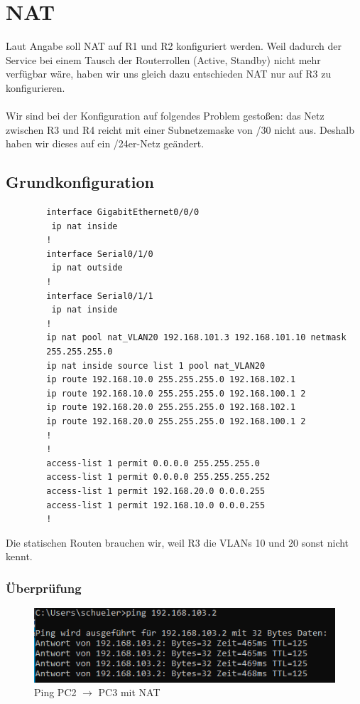 \documentclass[a4paper, ngerman]{article}
\begin{document}
\section{NAT}
Laut Angabe soll NAT auf R1 und R2 konfiguriert werden. Weil dadurch der Service bei einem Tausch der Routerrollen (Active, Standby)
nicht mehr verfügbar wäre, haben wir uns gleich dazu entschieden NAT nur auf R3 zu konfigurieren. \\ \\
Wir sind bei der Konfiguration auf folgendes Problem gestoßen: das Netz zwischen R3 und R4 reicht mit einer Subnetzemaske
von /30 nicht aus. Deshalb haben wir dieses auf ein /24er-Netz geändert.

\subsection{Grundkonfiguration}
\begin{framed}
    \begin{verbatim}
        interface GigabitEthernet0/0/0
         ip nat inside
        !
        interface Serial0/1/0
         ip nat outside
        !
        interface Serial0/1/1
         ip nat inside
        !
        ip nat pool nat_VLAN20 192.168.101.3 192.168.101.10 netmask 
        255.255.255.0
        ip nat inside source list 1 pool nat_VLAN20
        ip route 192.168.10.0 255.255.255.0 192.168.102.1
        ip route 192.168.10.0 255.255.255.0 192.168.100.1 2
        ip route 192.168.20.0 255.255.255.0 192.168.102.1
        ip route 192.168.20.0 255.255.255.0 192.168.100.1 2
        !
        !
        access-list 1 permit 0.0.0.0 255.255.255.0
        access-list 1 permit 0.0.0.0 255.255.255.252
        access-list 1 permit 192.168.20.0 0.0.0.255
        access-list 1 permit 192.168.10.0 0.0.0.255
        !
    \end{verbatim}
\end{framed}

Die statischen Routen brauchen wir, weil R3 die VLANs 10 und 20 sonst nicht kennt.

\subsubsection{Überprüfung}
\begin{figure}[H]
    \centering
    \includegraphics[scale=0.7]{screenshots/after nat.PNG}
    \caption{Ping PC2 $\rightarrow$ PC3 mit NAT}
\end{figure}
\end{document}
